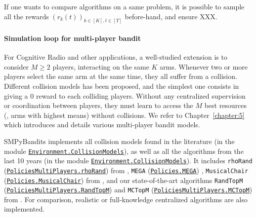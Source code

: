 If one wants to compare algorithms on a same problem, it is possible to sample all the rewards $(r_k(t))_{k\in[K], t\in[T]}$ before-hand, and ensure XXX.


\paragraph{Simulation loop for multi-player bandit}

For Cognitive Radio and other applications, a well-studied extension is to consider $M\geq2$ players, interacting on the same $K$ arms.
Whenever two or more players select the same arm at the same time, they all suffer from a collision.
%
Different collision models has been proposed, and the simplest one consists in giving a $0$ reward to each colliding players.
Without any centralized supervision or coordination between players, they must learn to access the $M$ best resources (\ie, arms with highest means) without collisions.
We refer to Chapter~\ref{chapter:5} which introduces and details various multi-player bandit models.

SMPyBandits implements all collision models found in the literature (in the module \texttt{\href{https://SMPyBandits.GitHub.io/docs/Environment.CollisionModels.html}{Environment.CollisionModels}}), as well as all the algorithms from the last 10 years (in the module \texttt{\href{https://SMPyBandits.GitHub.io/docs/Environment.CollisionModels.html}{Environment.CollisionModels}}).
%
It includes
\texttt{rhoRand} (\texttt{\href{https://SMPyBandits.GitHub.io/docs/PoliciesMultiPlayers.rhoRand.html}{PoliciesMultiPlayers.rhoRand}}) from \cite{Anandkumar11},
\texttt{MEGA} (\texttt{\href{https://SMPyBandits.GitHub.io/docs/Policies.MEGA.html}{Policies.MEGA}}) \cite{Avner15},
\texttt{MusicalChair} (\texttt{\href{https://SMPyBandits.GitHub.io/docs/Policies.MusicalChair.html}{Policies.MusicalChair}}) from \cite{Rosenski16},
and our state-of-the-art algorithms
\texttt{RandTopM} (\texttt{\href{https://SMPyBandits.GitHub.io/docs/PoliciesMultiPlayers.RandTopM.html}{PoliciesMultiPlayers.RandTopM}}) and
\texttt{MCTopM} (\texttt{\href{https://SMPyBandits.GitHub.io/docs/PoliciesMultiPlayers.MCTopM.html}{PoliciesMultiPlayers.MCTopM}}) from \cite{Besson2018ALT}.
For comparison, realistic or full-knowledge centralized algorithms are also implemented.

